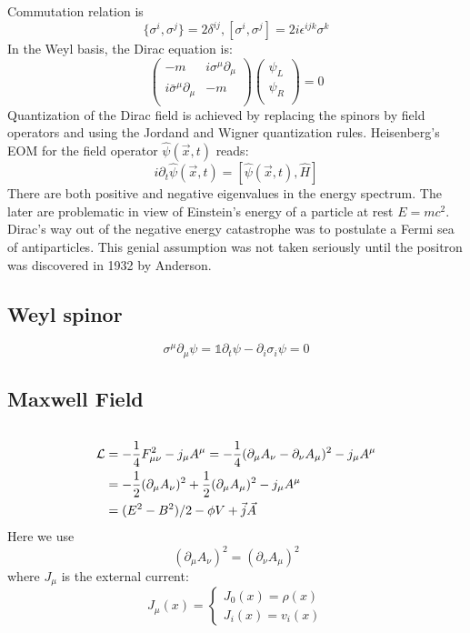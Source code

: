 Commutation relation is
\[
    \{\sigma^i, \sigma^j\} = 2\delta^{ij}, 
    [\sigma^i, \sigma^j] = 2i\epsilon^{ijk}\sigma^k
    \]
In the Weyl basis, the Dirac equation is:
\[
    \begin{pmatrix}
	-m  & i\sigma^\mu\partial_\mu	\\
	i\bar{\sigma}^\mu\partial_\mu	& -m	\\
    \end{pmatrix}
    \begin{pmatrix}
	\psi_L	\\
	\psi_R	\\
    \end{pmatrix} = 0
\]
Quantization of the Dirac field is achieved by replacing the spinors by
field operators and using the Jordand and Wigner quantization rules.
Heisenberg's EOM for the field operator $\hat{\psi}(\vec{x}, t)$
reads:
$$ i\partial_{t}\hat{\psi}(\vec{x}, t) = [
    \hat{\psi}(\vec{x}, t), \hat{H}]$$
There are both positive and negative eigenvalues in the energy spectrum. The
later are problematic in view of Einstein’s energy of a particle at rest 
$ E = mc^2 $. Dirac’s way out of the negative energy catastrophe was to 
postulate a Fermi sea of antiparticles. This genial assumption was not 
taken seriously until the positron was discovered in 1932 by Anderson.

\subsection{Weyl spinor}
\[
    \sigma^\mu\partial_\mu\psi=\mathds{1}\partial_t\psi-\partial_i\sigma_i\psi=0
    \]

\subsection{Maxwell Field}
\begin{equation}
    \label{Maxwell Eqn}
\end{equation}

\[ 
\begin{aligned}
    \mathcal{L} &= -\frac{1}{4}F^2_{\mu\nu} - j_{\mu}A^{\mu} 
    =-\frac{1}{4}(\partial_{\mu}A_\nu-\partial_{\nu}A_\mu)^2-j_{\mu}A^{\mu}\\
    &=-\frac{1}{2}(\partial_{\mu}A_\nu)^2+\frac{1}{2}(\partial_{\mu}A_\mu)^2-j_{\mu}A^{\mu}\\
    &=(E^2 - B^2)/2 - \phi V + \vec{j}\vec{A} 
\end{aligned}
    \]
Here we use
\[
    (\partial_{\mu}A_\nu)^2=(\partial_{\nu}A_\mu)^2
    \]
where $J_\mu$ is the external current:
\[ J_\mu(x) = \left\{ 
\begin{aligned}
    J_0(x) = \rho(x) \\
    J_i(x) = v_i(x)
\end{aligned}
\right.\]

